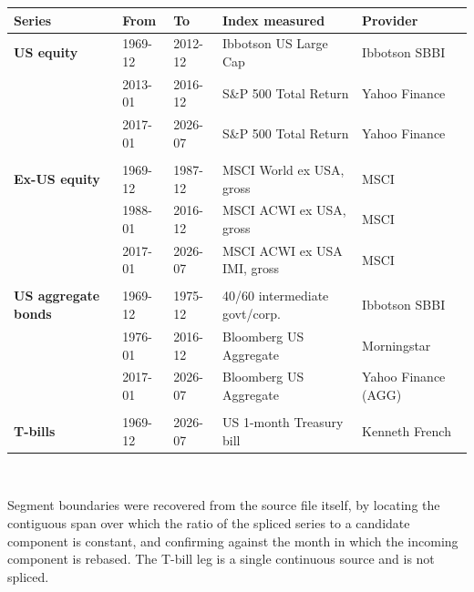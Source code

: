\small
\begin{tabular}{lllll}
\toprule
Series & From & To & Index measured & Provider \\
\midrule
\textbf{US equity} & 1969-12 & 2012-12 & Ibbotson US Large Cap & Ibbotson SBBI \\
 & 2013-01 & 2016-12 & S\&P 500 Total Return & Yahoo Finance \\
 & 2017-01 & 2026-07 & S\&P 500 Total Return & Yahoo Finance \\
\addlinespace \\
\textbf{Ex-US equity} & 1969-12 & 1987-12 & MSCI World ex USA, gross & MSCI \\
 & 1988-01 & 2016-12 & MSCI ACWI ex USA, gross & MSCI \\
 & 2017-01 & 2026-07 & MSCI ACWI ex USA IMI, gross & MSCI \\
\addlinespace \\
\textbf{US aggregate bonds} & 1969-12 & 1975-12 & 40/60 intermediate govt/corp. & Ibbotson SBBI \\
 & 1976-01 & 2016-12 & Bloomberg US Aggregate & Morningstar \\
 & 2017-01 & 2026-07 & Bloomberg US Aggregate & Yahoo Finance (AGG) \\
\addlinespace \\
\textbf{T-bills} & 1969-12 & 2026-07 & US 1-month Treasury bill & Kenneth French \\
\bottomrule
\end{tabular}
\\[0.4em]
\begin{minipage}{\linewidth}\footnotesize Segment boundaries were recovered from the source file itself, by locating the contiguous span over which the ratio of the spliced series to a candidate component is constant, and confirming against the month in which the incoming component is rebased. The T-bill leg is a single continuous source and is not spliced.\end{minipage}
